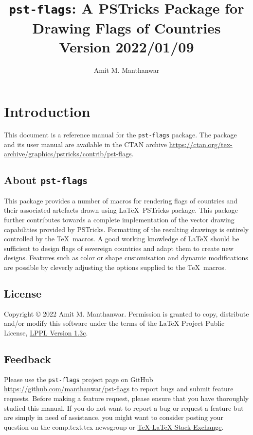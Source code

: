 \documentclass{amm-pst-doc}
\title{\vspace*{-10mm}
\texttt{pst-flags}: A PSTricks Package for Drawing Flags of Countries\\[2mm]
\Large{Version 2022/01/09}}
\author{Amit M. Manthanwar}
\date{}
\begin{document}
\maketitle

\section{Introduction}
This document is a reference manual for the \texttt{pst-flags} package. The package and its user manual are available in the CTAN archive \href{https://ctan.org/tex-archive/graphics/pstricks/contrib/pst-flags} {https://ctan.org/tex-archive/graphics/pstricks/contrib/pst-flags}.

\subsection{About \texttt{pst-flags}}
This package provides a number of macros for rendering flags of countries and their associated artefacts drawn using \LaTeX\ PSTricks package. This package further contributes towards a complete implementation of the vector drawing capabilities provided by PSTricks. Formatting of the resulting drawings is entirely controlled by the \TeX\ macros. A good working knowledge of LaTeX should be sufficient to design flags of sovereign countries and adapt them to create new designs. Features such as color or shape customisation and dynamic modifications are possible by cleverly adjusting the options supplied to the \TeX\ macros.

\subsection{License}
Copyright © 2022 Amit M. Manthanwar. Permission is granted to
copy, distribute and/or modify this software under the terms of the LaTeX Project Public License, \href{https://www.latex-project.org/lppl.txt}{LPPL Version 1.3c}.

\subsection{Feedback}
Please use the \texttt{pst-flags} project page on GitHub \href{https://github.com/manthanwar/pst-flags}{https://github.com/manthanwar/pst-flags} to report bugs and submit feature requests. Before making a feature request, please ensure that you have thoroughly studied this manual. If you do not want to report a bug or request a feature but are simply in need of assistance, you might want to consider posting your question on the comp.text.tex newsgroup or  \href{https://tex.stackexchange.com/questions/tagged/pst-flags} {TeX-LaTeX Stack Exchange}.
\end{document}
